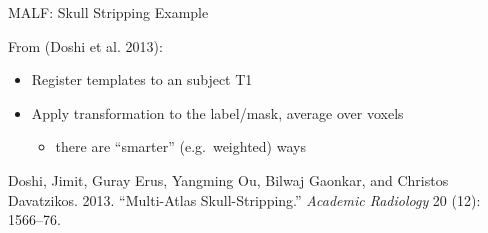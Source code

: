 \documentclass[ignorenonframetext,]{beamer}
\providecommand{\tightlist}{%
  \setlength{\itemsep}{0pt}\setlength{\parskip}{0pt}}
\begin{document}
\begin{frame}{MALF: Skull Stripping Example}
\protect\hypertarget{malf-skull-stripping-example}{}

From (Doshi et al. 2013):

\begin{itemize}
\tightlist
\item
  Register templates to an subject T1
\item
  Apply transformation to the label/mask, average over voxels

  \begin{itemize}
  \tightlist
  \item
    there are ``smarter'' (e.g.~weighted) ways
  \end{itemize}
\end{itemize}

\hypertarget{refs}{}
\leavevmode\hypertarget{ref-mass}{}%
Doshi, Jimit, Guray Erus, Yangming Ou, Bilwaj Gaonkar, and Christos
Davatzikos. 2013. ``Multi-Atlas Skull-Stripping.'' \emph{Academic
Radiology} 20 (12): 1566--76.

\end{frame}
\end{document}

